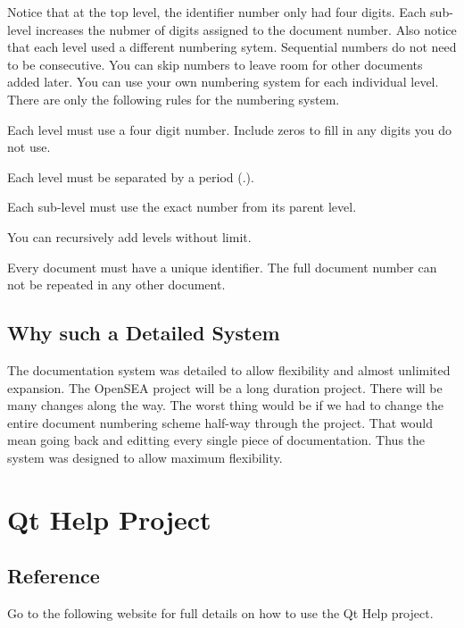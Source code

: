 Notice that at the top level, the identifier number only had four digits. Each sub-\/level increases the nubmer of digits assigned to the document number. Also notice that each level used a different numbering sytem. Sequential numbers do not need to be consecutive. You can skip numbers to leave room for other documents added later. You can use your own numbering system for each individual level. There are only the following rules for the numbering system.


\begin{DoxyEnumerate}
\item Each level must use a four digit number. Include zeros to fill in any digits you do not use.
\end{DoxyEnumerate}
\begin{DoxyEnumerate}
\item Each level must be separated by a period (.).
\item Each sub-\/level must use the exact number from its parent level.
\end{DoxyEnumerate}
\begin{DoxyEnumerate}
\item You can recursively add levels without limit.
\item Every document must have a unique identifier. The full document number can not be repeated in any other document.
\end{DoxyEnumerate}\hypertarget{docnumbersys_why-system}{}\subsection{Why such a Detailed System}\label{docnumbersys_why-system}
The documentation system was detailed to allow flexibility and almost unlimited expansion. The Open\-S\-E\-A project will be a long duration project. There will be many changes along the way. The worst thing would be if we had to change the entire document numbering scheme half-\/way through the project. That would mean going back and editting every single piece of documentation. Thus the system was designed to allow maximum flexibility. \hypertarget{helpproject}{}\section{Qt Help Project}\label{helpproject}
\hypertarget{helpproject_helproject_reference}{}\subsection{Reference}\label{helpproject_helproject_reference}
Go to the following website for full details on how to use the Qt Help project.

